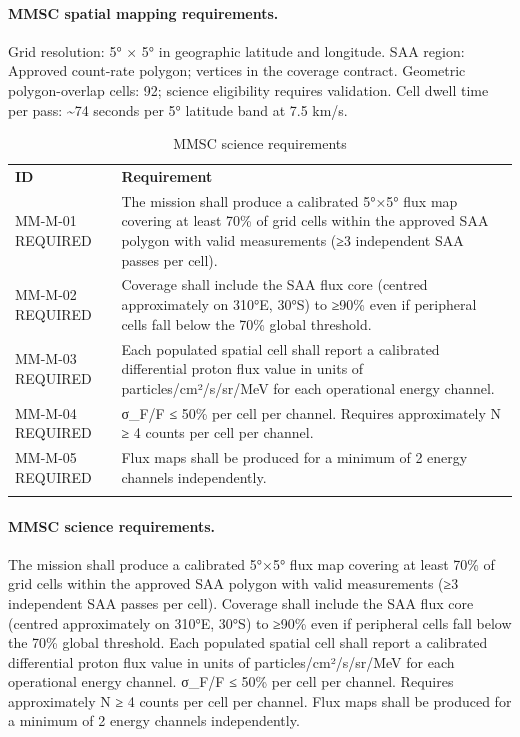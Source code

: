 \paragraph{MMSC spatial mapping requirements.} Grid resolution: 5° × 5° in geographic latitude and longitude. SAA region: Approved count-rate polygon; vertices in the coverage contract. Geometric polygon-overlap cells: 92; science eligibility requires validation. Cell dwell time per pass: \textasciitilde74 seconds per 5° latitude band at 7.5 km/s.
\fi

\ifrequirementsedition
\begin{longtable}{@{}
  >{\raggedright\arraybackslash}p{}
  >{\raggedright\arraybackslash}p{}@{}}
\caption{MMSC science requirements}\label{tab:01-mission-context-3}\\
\toprule\noalign{}
\textbf{ID} & \textbf{Requirement} \\
MM-M-01 REQUIRED & The mission shall produce a calibrated 5°×5° flux map covering at least
70\% of grid cells within the approved SAA polygon with valid measurements
(≥3 independent SAA passes per cell). \\
MM-M-02 REQUIRED & Coverage shall include the SAA flux core (centred approximately on
310°E, 30°S) to ≥90\% even if peripheral cells fall below the 70\%
global threshold. \\
MM-M-03 REQUIRED & Each populated spatial cell shall report a calibrated differential
proton flux value in units of particles/cm²/s/sr/MeV for each
operational energy channel. \\
MM-M-04 REQUIRED & σ\_F/F ≤ 50\% per cell per channel. Requires approximately N ≥ 4 counts
per cell per channel. \\
MM-M-05 REQUIRED & Flux maps shall be produced for a minimum of 2 energy channels
independently. \\
\midrule\noalign{}
\endhead
\bottomrule\noalign{}
\endlastfoot
\end{longtable}
\else
\paragraph{MMSC science requirements.} The mission shall produce a calibrated 5°×5° flux map covering at least
70\% of grid cells within the approved SAA polygon with valid measurements
(≥3 independent SAA passes per cell). Coverage shall include the SAA flux core (centred approximately on
310°E, 30°S) to ≥90\% even if peripheral cells fall below the 70\%
global threshold. Each populated spatial cell shall report a calibrated differential
proton flux value in units of particles/cm²/s/sr/MeV for each
operational energy channel. σ\_F/F ≤ 50\% per cell per channel. Requires approximately N ≥ 4 counts
per cell per channel. Flux maps shall be produced for a minimum of 2 energy channels
independently.
\fi


